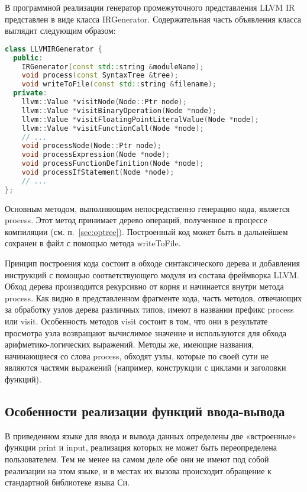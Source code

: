 В программной реализации генератор промежуточного представления LLVM IR представлен в виде класса IRGenerator.
Содержательная часть объявления класса выглядит следующим образом:

\begin{lstlisting}[language=C++, caption=Объявление класса LLVMIRGenerator]
class LLVMIRGenerator {
  public:
    IRGenerator(const std::string &moduleName);
    void process(const SyntaxTree &tree);
    void writeToFile(const std::string &filename);
  private:
    llvm::Value *visitNode(Node::Ptr node);
    llvm::Value *visitBinaryOperation(Node *node);
    llvm::Value *visitFloatingPointLiteralValue(Node *node);
    llvm::Value *visitFunctionCall(Node *node);
    // ...
    void processNode(Node::Ptr node);
    void processExpression(Node *node);
    void processFunctionDefinition(Node *node);
    void processIfStatement(Node *node);
    // ...
};
\end{lstlisting}

Основным методом, выполняющим непосредственно генерацию кода, является process.
Этот метод принимает дерево операций, полученное в процессе компиляции (см. п.~\ref{sec:optree}).
Построенный код может быть в дальнейшем сохранен в файл с помощью метода writeToFile.

Принцип построения кода состоит в обходе синтаксического дерева и добавления инструкций с помощью соответствующего модуля из состава фреймворка LLVM.
Обход дерева производится рекурсивно от корня и начинается внутри метода process.
Как видно в представленном фрагменте кода, часть методов, отвечающих за обработку узлов дерева различных типов, имеют в названии префикс process или visit.
Особенность методов visit состоит в том, что они в результате просмотра узла возвращают вычислимое значение и используются для обхода арифметико-логических выражений.
Методы же, имеющие названия, начинающиеся со слова process, обходят узлы, которые по своей сути не являются частями выражений (например, конструкции с циклами и заголовки функций).

\subsection{Особенности реализации функций ввода-вывода}

В приведенном языке для ввода и вывода данных определены две «встроенные» функции print и input, реализация которых не может быть переопределена пользователем.
Тем не менее на самом деле обе они не имеют под собой реализации на этом языке, и в местах их вызова происходит обращение к стандартной библиотеке языка Си.


